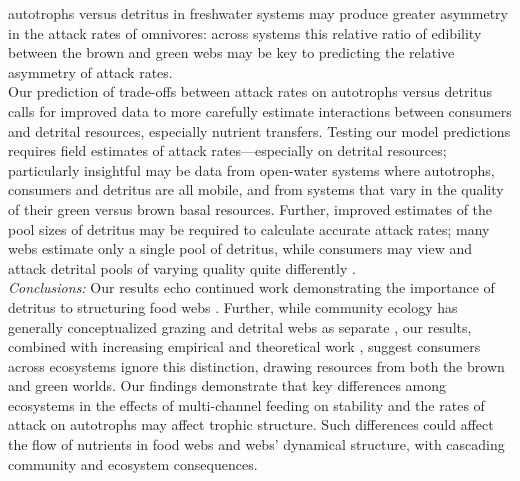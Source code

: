 \documentclass[12pt,a4paper,oneside]{article}
\begin{document}
autotrophs versus detritus in freshwater
systems may produce greater asymmetry in the attack rates of
omnivores: across systems this relative ratio of edibility between the brown
and green webs may be key to predicting the relative asymmetry of attack rates.
\\
\indent Our prediction of trade-offs between attack rates on autotrophs versus
detritus calls for improved data to more 
carefully estimate interactions between
consumers and detrital resources, especially nutrient transfers. Testing our model predictions requires field estimates of
attack rates---especially on detrital resources; particularly
insightful may be data from 
open-water systems where autotrophs, consumers and detritus are all
mobile, and from systems that vary in the quality of their green versus brown
basal resources. Further, improved
estimates of the pool sizes of detritus may be required to calculate accurate attack rates; many webs estimate only a single pool of
detritus, while consumers may view and attack detrital pools of varying quality quite differently \citep{Wilson:2011qo}.
\\
\newline
\noindent \emph{Conclusions:} Our results echo continued work demonstrating the importance
of detritus to structuring food webs
\citep{Allesina:2009,Odum:1984}. Further, while community ecology has generally
conceptualized grazing and detrital webs as separate
\citep{Moore:2004}, our results, combined with increasing empirical
and theoretical work \citep{Anderson:2008, Vadeboncoeur:2005,
 Moore:1988,Blanchard:2011}, suggest consumers across ecosystems ignore this
distinction, drawing resources from both the brown and green
worlds. Our
findings demonstrate that key differences among ecosystems in the effects of multi-channel feeding on stability
and the rates of attack on autotrophs may affect trophic structure. Such differences could affect the flow of nutrients in food webs and webs' dynamical structure, with cascading community  and ecosystem consequences.\\


\end{document}
